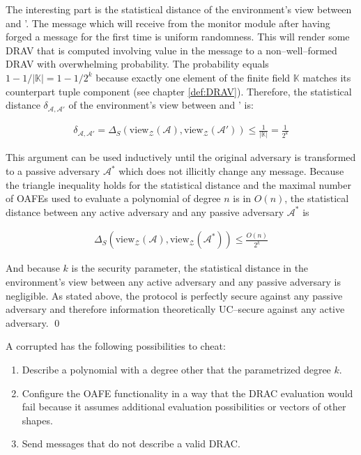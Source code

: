 The interesting part is the statistical distance of the environment's view
between \JWadv{} and \JWadv{}'. The message which \JWadv{} will receive from the
monitor module after having forged a message for the first time is uniform
randomness.  This will render some DRAV that is computed involving value in the
message to a non--well--formed DRAV with overwhelming probability. The
probability equals $1-1/|\mathbb{K}| = 1-1/2^k$ because exactly one element of
the finite field $\mathbb{K}$ matches its counterpart tuple component (see
chapter \ref{def:DRAV}). Therefore, the statistical distance
$\delta_{\mathcal{A},\mathcal{A}'}$ of the environment's view between \JWadv{}
and \JWadv{}' is:

\begin{align*}
  \delta_{\mathcal{A},\mathcal{A}'} =
  \Delta_S(\text{view}_\mathcal{Z}(\mathcal{A}),
  \text{view}_\mathcal{Z}(\mathcal{A}'))
  \leq \frac{1}{|\mathbb{K}|}
  = \frac{1}{2^k}
\end{align*}

\noindent{}This argument can be used inductively until the original adversary
\JWadv{} is transformed to a passive adversary $\mathcal{A}^*$ which does not
illicitly change any message. Because the triangle inequality holds for the
statistical distance and the maximal number of OAFEs used to evaluate a
polynomial of degree $n$ is in $O(n)$, the statistical distance between any
active adversary \JWadv{} and any passive adversary $\mathcal{A}^*$ is

\begin{align*}
  \Delta_S(\text{view}_\mathcal{Z}(\mathcal{A}),
  \text{view}_\mathcal{Z}(\mathcal{A}^*))
  \leq \frac{O(n)}{2^k}
\end{align*}

\noindent{}And because $k$ is the security parameter, the statistical distance
in the environment's view between any active adversary and any passive adversary
is negligible. As stated above, the protocol is perfectly secure against any
passive adversary and therefore information theoretically UC--secure against any
active adversary. \qed



A corrupted \JWpOne{} has the following possibilities to cheat:

\begin{enumerate}

  \item Describe a polynomial with a degree other that the parametrized degree
    $k$.

  \item Configure the OAFE functionality in a way that the DRAC evaluation would
    fail because it assumes additional evaluation possibilities or vectors of
    other shapes.

  \item Send messages that do not describe a valid DRAC\@.

\end{enumerate}

